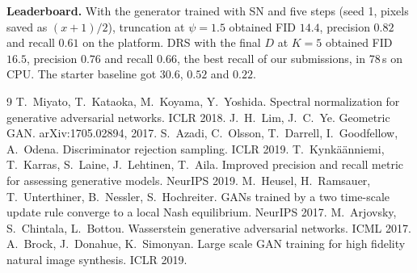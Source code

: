 \documentclass[10pt,a4paper]{article}
\begin{document}
\textbf{Leaderboard.} With the generator trained with SN and five steps (seed 1, pixels saved as $(x+1)/2$), truncation at $\psi=1.5$ obtained FID $14.4$, precision $0.82$ and recall $0.61$ on the platform. DRS with the final $D$ at $K=5$ obtained FID $16.5$, precision $0.76$ and recall $0.66$, the best recall of our submissions, in 78\,s on CPU. The starter baseline got $30.6$, $0.52$ and $0.22$.

\begingroup
\small
\setlength{\bibsep}{1pt}
\begin{thebibliography}{9}
 T.~Miyato, T.~Kataoka, M.~Koyama, Y.~Yoshida. Spectral normalization for generative adversarial networks. ICLR 2018.
 J.~H.~Lim, J.~C.~Ye. Geometric GAN. arXiv:1705.02894, 2017.
 S.~Azadi, C.~Olsson, T.~Darrell, I.~Goodfellow, A.~Odena. Discriminator rejection sampling. ICLR 2019.
 T.~Kynkäänniemi, T.~Karras, S.~Laine, J.~Lehtinen, T.~Aila. Improved precision and recall metric for assessing generative models. NeurIPS 2019.
 M.~Heusel, H.~Ramsauer, T.~Unterthiner, B.~Nessler, S.~Hochreiter. GANs trained by a two time-scale update rule converge to a local Nash equilibrium. NeurIPS 2017.
 M.~Arjovsky, S.~Chintala, L.~Bottou. Wasserstein generative adversarial networks. ICML 2017.
 A.~Brock, J.~Donahue, K.~Simonyan. Large scale GAN training for high fidelity natural image synthesis. ICLR 2019.
\end{thebibliography}
\endgroup
\end{document}
